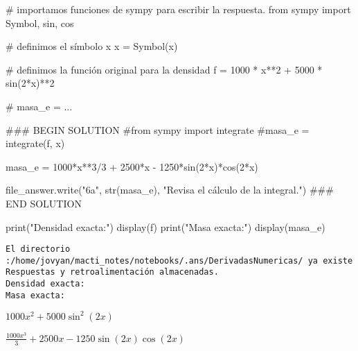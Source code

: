 \documentclass[
  letterpaper,
  DIV=11,
  numbers=noendperiod]{scrreprt}
\newenvironment{Shaded}{\begin{snugshade}}{\end{snugshade}}
\newcommand{\BuiltInTok}[1]{\textcolor[rgb]{0.00,0.23,0.31}{#1}}
\newcommand{\CommentTok}[1]{\textcolor[rgb]{0.37,0.37,0.37}{#1}}
\newcommand{\DecValTok}[1]{\textcolor[rgb]{0.68,0.00,0.00}{#1}}
\newcommand{\ImportTok}[1]{\textcolor[rgb]{0.00,0.46,0.62}{#1}}
\newcommand{\NormalTok}[1]{\textcolor[rgb]{0.00,0.23,0.31}{#1}}
\newcommand{\OperatorTok}[1]{\textcolor[rgb]{0.37,0.37,0.37}{#1}}
\newcommand{\RegionMarkerTok}[1]{\textcolor[rgb]{0.00,0.23,0.31}{#1}}
\newcommand{\StringTok}[1]{\textcolor[rgb]{0.13,0.47,0.30}{#1}}
\begin{document}
\begin{Shaded}
\begin{Highlighting}[]
\CommentTok{\# importamos funciones de sympy para escribir la respuesta.}
\ImportTok{from}\NormalTok{ sympy }\ImportTok{import}\NormalTok{ Symbol, sin, cos}

\CommentTok{\# definimos el símbolo x}
\NormalTok{x }\OperatorTok{=}\NormalTok{ Symbol(}\StringTok{\textquotesingle{}x\textquotesingle{}}\NormalTok{) }

\CommentTok{\# definimos la función original para la densidad}
\NormalTok{f }\OperatorTok{=} \DecValTok{1000} \OperatorTok{*}\NormalTok{ x}\OperatorTok{**}\DecValTok{2} \OperatorTok{+} \DecValTok{5000} \OperatorTok{*}\NormalTok{ sin(}\DecValTok{2}\OperatorTok{*}\NormalTok{x)}\OperatorTok{**}\DecValTok{2}

\CommentTok{\# masa\_e = ...}

\CommentTok{\#\#\# }\RegionMarkerTok{BEGIN}\CommentTok{ SOLUTION}
\CommentTok{\#from sympy import integrate}
\CommentTok{\#masa\_e = integrate(f, x)}

\NormalTok{masa\_e }\OperatorTok{=} \DecValTok{1000}\OperatorTok{*}\NormalTok{x}\OperatorTok{**}\DecValTok{3}\OperatorTok{/}\DecValTok{3} \OperatorTok{+} \DecValTok{2500}\OperatorTok{*}\NormalTok{x }\OperatorTok{{-}} \DecValTok{1250}\OperatorTok{*}\NormalTok{sin(}\DecValTok{2}\OperatorTok{*}\NormalTok{x)}\OperatorTok{*}\NormalTok{cos(}\DecValTok{2}\OperatorTok{*}\NormalTok{x)}

\NormalTok{file\_answer.write(}\StringTok{"6a"}\NormalTok{, }\BuiltInTok{str}\NormalTok{(masa\_e), }\StringTok{"Revisa el cálculo de la integral."}\NormalTok{)}
\CommentTok{\#\#\# }\RegionMarkerTok{END}\CommentTok{ SOLUTION}

\BuiltInTok{print}\NormalTok{(}\StringTok{"Densidad exacta:"}\NormalTok{)}
\NormalTok{display(f)}
\BuiltInTok{print}\NormalTok{(}\StringTok{"Masa exacta:"}\NormalTok{)}
\NormalTok{display(masa\_e)}
\end{Highlighting}
\end{Shaded}

\begin{verbatim}
El directorio :/home/jovyan/macti_notes/notebooks/.ans/DerivadasNumericas/ ya existe
Respuestas y retroalimentación almacenadas.
Densidad exacta:
Masa exacta:
\end{verbatim}

$\displaystyle 1000 x^{2} + 5000 \sin^{2}{\left(2 x \right)}$

$\displaystyle \frac{1000 x^{3}}{3} + 2500 x - 1250 \sin{\left(2 x \right)} \cos{\left(2 x \right)}$
\end{document}
